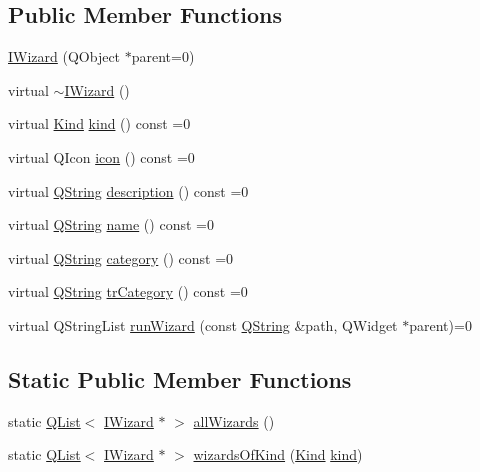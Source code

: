 \subsection*{Public Member Functions}
\begin{DoxyCompactItemize}
\item 
\hyperlink{group___core_plugin_ga0316d3bb75bea70865e85986aa4ed08e}{I\-Wizard} (Q\-Object $\ast$parent=0)
\item 
virtual \hyperlink{group___core_plugin_gac105c31c0637a11c0ae093f4045b920e}{$\sim$\-I\-Wizard} ()
\item 
virtual \hyperlink{group___core_plugin_ga90d21d8ad72cb14ddb8486fdff7b51f4}{Kind} \hyperlink{group___core_plugin_gaa6c10b903553ec4f5b93c74ebe8e76b9}{kind} () const =0
\item 
virtual Q\-Icon \hyperlink{group___core_plugin_gad0fdeb21587d720cb3d0d69b980610bd}{icon} () const =0
\item 
virtual \hyperlink{group___u_a_v_objects_plugin_gab9d252f49c333c94a72f97ce3105a32d}{Q\-String} \hyperlink{group___core_plugin_ga4f4ab96df11d7229b9c4513d38f0b09c}{description} () const =0
\item 
virtual \hyperlink{group___u_a_v_objects_plugin_gab9d252f49c333c94a72f97ce3105a32d}{Q\-String} \hyperlink{group___core_plugin_ga3b37cbe32b268315a5b2e8d4c061974c}{name} () const =0
\item 
virtual \hyperlink{group___u_a_v_objects_plugin_gab9d252f49c333c94a72f97ce3105a32d}{Q\-String} \hyperlink{group___core_plugin_ga36d083fbed01321396b7f13cabcf1e88}{category} () const =0
\item 
virtual \hyperlink{group___u_a_v_objects_plugin_gab9d252f49c333c94a72f97ce3105a32d}{Q\-String} \hyperlink{group___core_plugin_ga4d03cf7a4a46528d289eea825847593a}{tr\-Category} () const =0
\item 
virtual Q\-String\-List \hyperlink{group___core_plugin_ga40d63dbc6350512777b72c0b7a9faa38}{run\-Wizard} (const \hyperlink{group___u_a_v_objects_plugin_gab9d252f49c333c94a72f97ce3105a32d}{Q\-String} \&path, Q\-Widget $\ast$parent)=0
\end{DoxyCompactItemize}
\subsection*{Static Public Member Functions}
\begin{DoxyCompactItemize}
\item 
static \hyperlink{class_q_list}{Q\-List}$<$ \hyperlink{class_core_1_1_i_wizard}{I\-Wizard} $\ast$ $>$ \hyperlink{group___core_plugin_ga636617c07dc09f77edce01c7da28fd63}{all\-Wizards} ()
\item 
static \hyperlink{class_q_list}{Q\-List}$<$ \hyperlink{class_core_1_1_i_wizard}{I\-Wizard} $\ast$ $>$ \hyperlink{group___core_plugin_ga40a38812ddc1fe7b881cd2a15665455e}{wizards\-Of\-Kind} (\hyperlink{group___core_plugin_ga90d21d8ad72cb14ddb8486fdff7b51f4}{Kind} \hyperlink{group___core_plugin_gaa6c10b903553ec4f5b93c74ebe8e76b9}{kind})
\end{DoxyCompactItemize}


